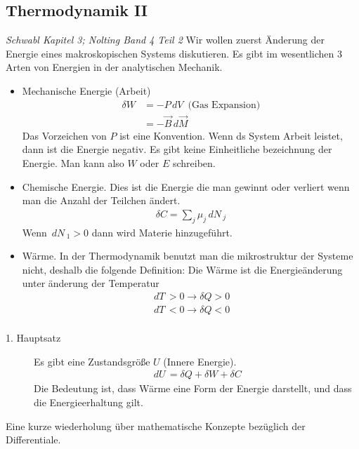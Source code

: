 \documentclass[11pt]{article}
\theoremstyle{plain}
\theoremstyle{mytheoremstyle}
\renewcommand{\d}[1]{\,d#1\,}
\begin{document}
\subsection*{Thermodynamik II}
\emph{Schwabl Kapitel 3; Nolting Band 4 Teil 2}
Wir wollen zuerst \"Anderung der Energie eines makroskopischen Systems diskutieren.
Es gibt im wesentlichen 3 Arten von Energien in der analytischen Mechanik.
\begin{itemize}
  \item Mechanische Energie (Arbeit)
    \begin{align*}
      \delta W & = - P \d{V} \text{ (Gas Expansion)} \\
               & = - \vec{B} \d{\vec{M}}
    \end{align*}
    Das Vorzeichen von $P$ ist eine Konvention. Wenn ds System Arbeit leistet,
    dann ist die Energie negativ.
    Es gibt keine Einheitliche bezeichnung der Energie. Man kann also 
    $W$ oder $E$ schreiben.
    
  \item  Chemische Energie. Dies ist die Energie die man gewinnt oder verliert
    wenn man die Anzahl der Teilchen \"andert.
    \begin{align*}
      \delta C = \sum_{j}^{} \mu_j \d{N}_j
    \end{align*}
    Wenn $ \d{N}_1 > 0$ dann wird Materie hinzugef\"uhrt.
  \item W\"arme. In der Thermodynamik benutzt man die mikrostruktur der Systeme
    nicht, deshalb die folgende Definition: Die W\"arme ist die Energie\"anderung
    unter \"anderung der Temperatur
    \begin{align*}
      \d{T} > 0 \to \delta Q > 0 \\
      \d{T} < 0 \to \delta Q < 0 \\
    \end{align*}
\end{itemize}
\begin{description}
  \item[1. Hauptsatz] Es gibt eine Zustandsgr\"o\ss{}e $U$ (Innere Energie).
    \begin{align*}
      \d{U} = \delta Q + \delta W + \delta C
    \end{align*}
    Die Bedeutung ist, dass W\"arme eine Form der Energie darstellt, und
    dass die Energieerhaltung gilt.
\end{description}
Eine kurze wiederholung \"uber mathematische Konzepte bez\"uglich der 
Differentiale.
\end{document}
